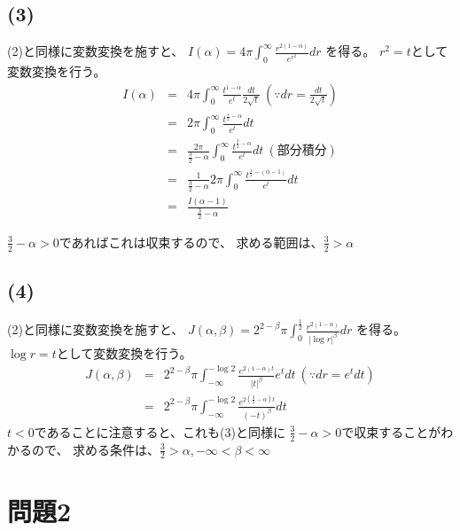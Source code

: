 \documentclass[]{jsarticle}
\begin{document}
    \subsection*{(3)}
        (2)と同様に変数変換を施すと、
        $\displaystyle I(\alpha) = 4\pi\int^\infty_0\frac{r^{2(1-\alpha)}}{e^{r^2}}dr$
        を得る。
        $r^2=t$として変数変換を行う。
        \begin{eqnarray}
            I(\alpha) &=& 4\pi\int^\infty_0\frac{t^{1-\alpha}}{e^t}\frac{dt}{2\sqrt{t}} \ \left(\because dr = \frac{dt}{2\sqrt{t}}\right) \nonumber \\
            &=& 2\pi\int^\infty_0\frac{t^{\frac{1}{2}-\alpha}}{e^t}dt \nonumber \\
            &=& \frac{2\pi}{\frac{3}{2} - \alpha}\int^\infty_0\frac{t^{\frac{3}{2}-\alpha}}{e^t}dt \ (部分積分) \nonumber \\
            &=& \frac{1}{\frac{3}{2} - \alpha}2\pi\int^\infty_0\frac{t^{\frac{1}{2}-(\alpha - 1)}}{e^t}dt \nonumber \\
            &=& \frac{I(\alpha - 1)}{\frac{3}{2} - \alpha} \nonumber
        \end{eqnarray}

        $\displaystyle\frac{3}{2} - \alpha > 0$であればこれは収束するので、
        求める範囲は、$\displaystyle\frac{3}{2} > \alpha$
    \subsection*{(4)}
        (2)と同様に変数変換を施すと、
        $\displaystyle J(\alpha, \beta) = 2^{2 - \beta}\pi\int^\frac{1}{2}_0\frac{r^{2(1-\alpha)}}{|\log r|^\beta}dr$
        を得る。
        $\log r = t$として変数変換を行う。
        \begin{eqnarray}
            J(\alpha, \beta) &=& 2^{2 - \beta}\pi\int^{-\log 2}_{-\infty}\frac{e^{2(1-\alpha)t}}{|t|^\beta}e^tdt \ \left(\because dr = e^tdt\right) \nonumber \\
            &=& 2^{2 - \beta}\pi\int^{-\log 2}_{-\infty}\frac{e^{2(\frac{3}{2}-\alpha)t}}{(-t)^\beta}dt \nonumber
        \end{eqnarray}
        $t < 0$であることに注意すると、これも(3)と同様に
        $\displaystyle\frac{3}{2} - \alpha > 0$で収束することがわかるので、
        求める条件は、$\displaystyle\frac{3}{2} > \alpha, -\infty<\beta<\infty$
\section*{問題2}
\end{document}
